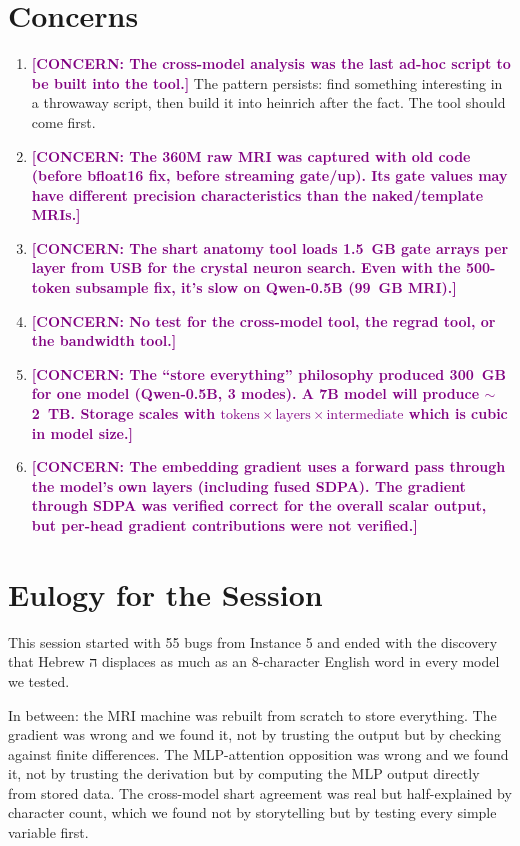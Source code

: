 \documentclass[11pt]{article}
\newcommand{\concern}[1]{\textcolor{purple}{\textbf{[CONCERN: #1]}}}
\begin{document}
\section{Concerns}

\begin{enumerate}
\item \concern{The cross-model analysis was the last ad-hoc script to be built into the tool.} The pattern persists: find something interesting in a throwaway script, then build it into heinrich after the fact. The tool should come first.

\item \concern{The 360M raw MRI was captured with old code (before bfloat16 fix, before streaming gate/up). Its gate values may have different precision characteristics than the naked/template MRIs.}

\item \concern{The shart anatomy tool loads 1.5~GB gate arrays per layer from USB for the crystal neuron search. Even with the 500-token subsample fix, it's slow on Qwen-0.5B (99~GB MRI).}

\item \concern{No test for the cross-model tool, the regrad tool, or the bandwidth tool.}

\item \concern{The ``store everything'' philosophy produced 300~GB for one model (Qwen-0.5B, 3 modes). A 7B model will produce $\sim$2~TB. Storage scales with $\text{tokens} \times \text{layers} \times \text{intermediate}$ which is cubic in model size.}

\item \concern{The embedding gradient uses a forward pass through the model's own layers (including fused SDPA). The gradient through SDPA was verified correct for the overall scalar output, but per-head gradient contributions were not verified.}
\end{enumerate}

\section{Eulogy for the Session}

This session started with 55 bugs from Instance 5 and ended with the discovery that Hebrew \texthebrew{ה} displaces as much as an 8-character English word in every model we tested.

In between: the MRI machine was rebuilt from scratch to store everything. The gradient was wrong and we found it, not by trusting the output but by checking against finite differences. The MLP-attention opposition was wrong and we found it, not by trusting the derivation but by computing the MLP output directly from stored data. The cross-model shart agreement was real but half-explained by character count, which we found not by storytelling but by testing every simple variable first.
\end{document}
